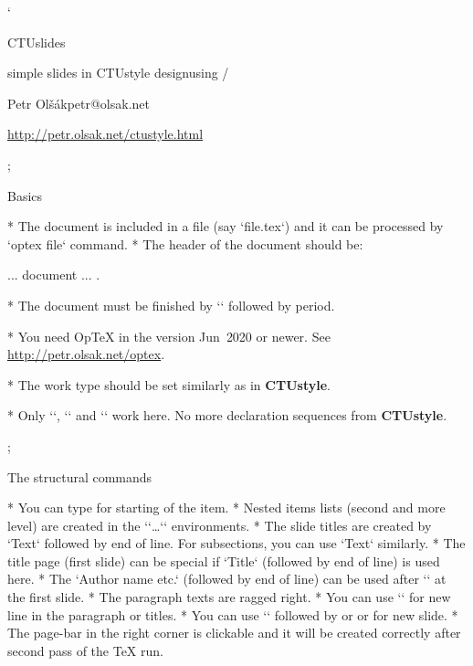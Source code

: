 

\slides
\worktype[O/EN]

\activettchar`


\slideshow 

\tit CTUslides 

\subtit simple slides in CTUstyle design\nl using \OpTeX/

\bigskip
\subtit\Black Petr Olšák\nl petr@olsak.net

\subtit\rm \url{http://petr.olsak.net/ctustyle.html}

\pg; %

\sec Basics

* The document is included in a file (say `file.tex`)\nl
  and it can be processed by `optex file` command.
* The header of the document should be:

\begtt
\slides           %
\worktype[B/EN]   %

\slideshow        %
... document ...
\pg.
\endtt

* The document must be finished by `\pg` followed by period.

* You need OpTeX in the version Jun~2020 or newer.\nl
  See \url{http://petr.olsak.net/optex}.

* The work type should be set similarly as in {\bf\Blue CTUstyle}.

* Only `\worktype`, `\faculty` and `\department`
  work here. No more declaration sequences from {\bf\Blue CTUstyle}.

\pg; %

\sec The structural commands

* You can type \code{\*} for starting of the item.
* Nested items lists (second and more level) are created in
  the `\begitems`\dots`\enditems` environments.
* The slide titles are created by `\sec Text` 
  followed by end of line.\nl 
  For subsections, you can use `\secc Text` similarly.
* The title page (first slide) can be special if `\tit Title`\nl
  (followed by end of line) is used here.
* The `\subtit Author name etc.` (followed by end of line)
  can be used after `\tit` at the first slide.
* The paragraph texts are ragged right.
* You can use `\nl` for new line in the paragraph or titles.
* You can use `\pg` followed by \code{+} or \code{;} or 
  for new slide.
* The page-bar in the right corner is clickable and it will be 
  created correctly after second pass of the \TeX{} run.

